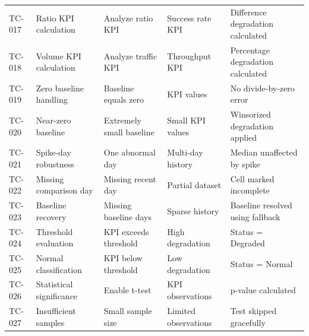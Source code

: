 \begin{center}
\begin{tabularx}{\textwidth}{l X X X X}
TC-017 & Ratio KPI calculation & Analyze ratio KPI & Success rate KPI & Difference degradation calculated \\
TC-018 & Volume KPI calculation & Analyze traffic KPI & Throughput KPI & Percentage degradation calculated \\
TC-019 & Zero baseline handling & Baseline equals zero & KPI values & No divide-by-zero error \\
TC-020 & Near-zero baseline & Extremely small baseline & Small KPI values & Winsorized degradation applied \\
TC-021 & Spike-day robustness & One abnormal day & Multi-day history & Median unaffected by spike \\
TC-022 & Missing comparison day & Missing recent day & Partial dataset & Cell marked incomplete \\
TC-023 & Baseline recovery & Missing baseline days & Sparse history & Baseline resolved using fallback \\
TC-024 & Threshold evaluation & KPI exceeds threshold & High degradation & Status = Degraded \\
TC-025 & Normal classification & KPI below threshold & Low degradation & Status = Normal \\
TC-026 & Statistical significance & Enable t-test & KPI observations & p-value calculated \\
TC-027 & Insufficient samples & Small sample size & Limited observations & Test skipped gracefully \\
\bottomrule
\end{tabularx}
\end{center}

